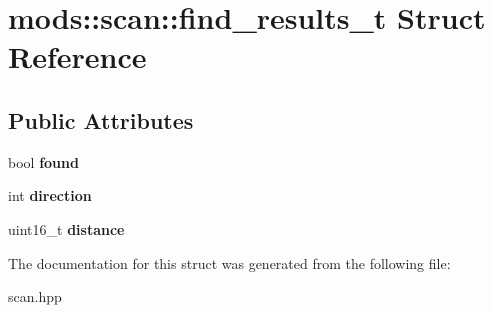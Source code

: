 \hypertarget{structmods_1_1scan_1_1find__results__t}{}\section{mods\+:\+:scan\+:\+:find\+\_\+results\+\_\+t Struct Reference}
\label{structmods_1_1scan_1_1find__results__t}
\subsection*{Public Attributes}
\begin{DoxyCompactItemize}
\item 
\mbox{\label{structmods_1_1scan_1_1find__results__t_a26ca1f4f3394d267ce77d779fd2e9cac}} 
bool {\bfseries found}
\item 
\mbox{\label{structmods_1_1scan_1_1find__results__t_a271bac61f7c20777a80fe5b58c268587}} 
int {\bfseries direction}
\item 
\mbox{\label{structmods_1_1scan_1_1find__results__t_a791e523aa417045445269240d0b7dad8}} 
uint16\+\_\+t {\bfseries distance}
\end{DoxyCompactItemize}


The documentation for this struct was generated from the following file\+:\begin{DoxyCompactItemize}
\item 
scan.\+hpp\end{DoxyCompactItemize}
